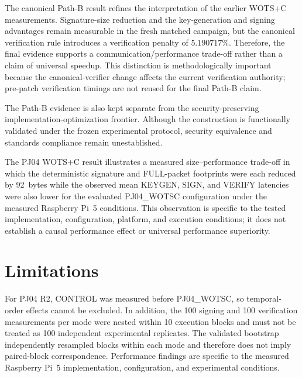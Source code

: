 \documentclass[pdflatex,sn-mathphys-num]{sn-jnl}
\begin{document}

The canonical Path-B result refines the interpretation of the
earlier WOTS+C measurements. Signature-size reduction and the
key-generation and signing advantages remain measurable in the
fresh matched campaign, but the canonical verification rule
introduces a verification penalty of $5.190717\%$. Therefore,
the final evidence supports a communication/performance
trade-off rather than a claim of universal speedup. This
distinction is methodologically important because the
canonical-verifier change affects the current verification
authority; pre-patch verification timings are not reused for
the final Path-B claim.

The Path-B evidence is also kept separate from the
security-preserving implementation-optimization frontier.
Although the construction is functionally validated under the
frozen experimental protocol, security equivalence and
standards compliance remain unestablished.



The PJ04 WOTS+C result illustrates a measured size--performance trade-off in
which the deterministic signature and FULL-packet footprints were each reduced
by 92~bytes while the observed mean KEYGEN, SIGN, and VERIFY latencies were
also lower for the evaluated PJ04\_WOTSC configuration under the measured
Raspberry Pi~5 conditions. This observation is specific to the tested
implementation, configuration, platform, and execution conditions; it does not
establish a causal performance effect or universal performance superiority.

\label{sec:discussion}



\section{Limitations}

For PJ04 R2, CONTROL was measured before PJ04\_WOTSC, so temporal-order
effects cannot be excluded. In addition, the 100 signing and 100 verification
measurements per mode were nested within 10 execution blocks and must not be
treated as 100 independent experimental replicates. The validated bootstrap
independently resampled blocks within each mode and therefore does not imply
paired-block correspondence. Performance findings are specific to the measured
Raspberry Pi~5 implementation, configuration, and experimental conditions.
\end{document}
